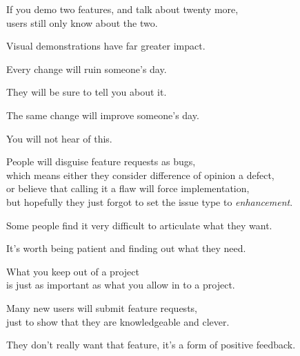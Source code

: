 \documentclass[t,handout,aspectratio=169]{beamer}
\begin{document}
\begin{frame}[fragile]%
    \vfill
    If you demo two features, and talk about twenty more, \\
    users still only know about the two. \pause

    Visual demonstrations have far greater impact.
\end{frame}

\begin{frame}[fragile]%
    \vfill
    Every change will ruin someone's day.

    They will be sure to tell you about it. \pause

    The same change will improve someone's day.

    You will not hear of this.
\end{frame}

\begin{frame}[fragile]%
    \vfill
    People will disguise feature requests as bugs, \pause \\
    which means either they consider difference of opinion a defect, \pause \\
    or believe that calling it a flaw will force implementation, \pause \\
    but hopefully they just forgot to set the issue type to \textit{enhancement}.
\end{frame}

\begin{frame}[fragile]%
    \vfill
    Some people find it very difficult to articulate what they want. \pause

    It's worth being patient and finding out what they need.
\end{frame}

\begin{frame}[fragile]%
    \vfill
    What you keep out of a project \pause \\
    is just as important as what you allow in to a project.
\end{frame}

\begin{frame}[fragile]%
    \vfill
    Many new users will submit feature requests, \\
    just to show that they are knowledgeable and clever. \pause

    They don't really want that feature, it's a form of positive feedback.
\end{frame}
\end{document}
